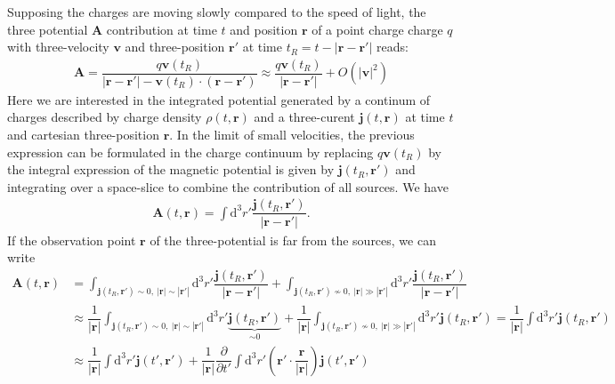 \documentclass[10pt, a4paper]{article}
\begin{document}
{Supposing the charges are moving slowly compared to the speed of light, the three potential $\mathbf{A}$ contribution at time $t$ and position $\mathbf{r}$ of a point charge charge $q$ with three-velocity $\mathbf{v}$ and three-position $\mathbf{r}'$ at time $t_R = t-|\mathbf{r} - \mathbf{r}'|$ reads: 
\begin{align*}
   \mathbf{A} =  \dfrac{q \mathbf{v}(t_R)}{|\mathbf{r} - \mathbf{r}'| - \mathbf{v}(t_R) \cdot (\mathbf{r} - \mathbf{r}')} \approx  \dfrac{q \mathbf{v}(t_R)}{|\mathbf{r} - \mathbf{r}'|} + O(|\mathbf{v}|^2)
\end{align*}
Here we are interested in the integrated potential generated by a continum of charges described by charge density $\rho(t, \mathbf{r})$ and a three-curent $\mathbf{j}(t, \mathbf{r})$ at time $t$ and cartesian three-position $\mathbf{r}$. In the limit of small velocities, the previous expression can be formulated in the charge continuum by replacing $q \mathbf{v}(t_R)$ by  the integral expression of the magnetic potential is given by $\mathbf{j}(t_R, \mathbf{r}')$ and integrating over a space-slice to combine the contribution of all sources. We have 
\begin{align*}
    \mathbf{A}(t, \mathbf{r}) = \int \text{d}^3r' \dfrac{\mathbf{j}(t_R, \mathbf{r}')}{|\mathbf{r} - \mathbf{r}'|}.
\end{align*}
If the observation point $\mathbf{r}$ of the three-potential is far from the sources, we can write 
\begin{align*}
    \mathbf{A}(t, \mathbf{r}) &= \int_{\mathbf{j}(t_R, \mathbf{r}') \sim 0,\ |\mathbf{r}|\sim |\mathbf{r}'|} \text{d}^3r' \dfrac{\mathbf{j}(t_R, \mathbf{r}')}{|\mathbf{r} - \mathbf{r}'|} + \int_{\mathbf{j}(t_R, \mathbf{r}') \not\sim 0,\ |\mathbf{r}|\gg |\mathbf{r}'|} \text{d}^3r' \dfrac{\mathbf{j}(t_R, \mathbf{r}')}{|\mathbf{r} - \mathbf{r}'|} \\&\approx \dfrac{1}{|\mathbf{r}|}\int_{\mathbf{j}(t_R, \mathbf{r}') \sim 0,\ |\mathbf{r}|\sim |\mathbf{r}'|} \text{d}^3r' \underbrace{\mathbf{j}(t_R, \mathbf{r}')}_{\sim 0}+ \dfrac{1}{|\mathbf{r}|}\int_{\mathbf{j}(t_R, \mathbf{r}') \not\sim 0,\ |\mathbf{r}|\gg |\mathbf{r}'|} \text{d}^3r' \mathbf{j}(t_R, \mathbf{r}') =  \dfrac{1}{|\mathbf{r}|} \int \text{d}^3r' \mathbf{j}(t_R, \mathbf{r}')\\
    &\approx \dfrac{1}{|\mathbf{r}|} \int \text{d}^3r' \mathbf{j}(t', \mathbf{r}') + \dfrac{1}{|\mathbf{r}|} \dfrac{\partial}{\partial t'}\int \text{d}^3r' \left(\mathbf{r}' \cdot \dfrac{\mathbf{r}}{|\mathbf{r}|}\right) \mathbf{j}(t', \mathbf{r}')

\end{align*}}
\end{document}

